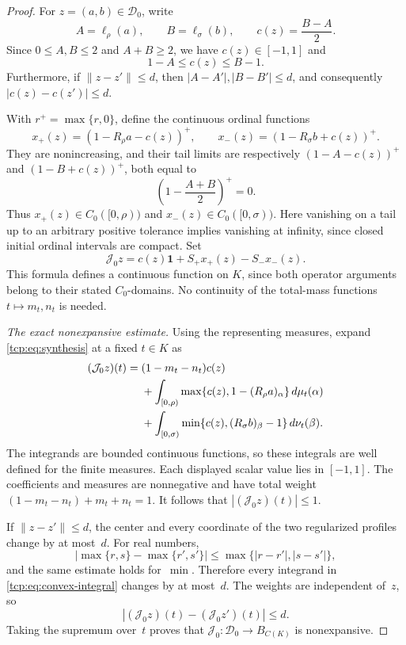 \documentclass[preprint,12pt,nopreprintline]{elsarticle}
\theoremstyle{definition}
\theoremstyle{remark}
\numberwithin{equation}{section}
\begin{document}
\begin{proof}
For $z=(a,b)\in\mathcal D_0$, write
\begin{equation}
 A=\ell_\rho(a),\qquad B=\ell_\sigma(b),\qquad
 c(z)=\frac{B-A}{2}.
 \label{tcp:eq:center}
\end{equation}
Since $0\le A,B\le2$ and $A+B\ge2$, we have $c(z)\in[-1,1]$ and
\begin{equation}
 1-A\le c(z)\le B-1.
 \label{tcp:eq:center-bounds}
\end{equation}
Furthermore, if $\|z-z'\|\le d$, then $|A-A'|,|B-B'|\le d$, and consequently $|c(z)-c(z')|\le d$.

With $r^+=\max\{r,0\}$, define the continuous ordinal functions
\begin{equation}
 x_+(z)=(1-R_\rho a-c(z))^+, \qquad x_-(z)=(1-R_\sigma b+c(z))^+.
 \label{tcp:eq:synthesis-profiles}
\end{equation}
They are nonincreasing, and their tail limits are respectively $(1-A-c(z))^+$ and $(1-B+c(z))^+$, both equal to
\[
 \left(1-\frac{A+B}{2}\right)^+=0.
\]
Thus $x_+(z)\in C_0([0,\rho))$ and $x_-(z)\in C_0([0,\sigma))$. Here vanishing on a tail up to an arbitrary positive tolerance implies vanishing at infinity, since closed initial ordinal intervals are compact. Set
\begin{equation}
\mathcal J_0z=c(z)\mathbf1+S_+x_+(z)-S_-x_-(z).
 \label{tcp:eq:synthesis}
\end{equation}
This formula defines a continuous function on $K$, since both operator arguments belong to their stated $C_0$-domains. No
continuity of the total-mass functions $t\mapsto m_t,n_t$ is needed.

\smallskip\noindent
\emph{The exact nonexpansive estimate.} Using the representing measures, expand \eqref{tcp:eq:synthesis} at a fixed $t\in K$ as
\begin{align}
 (\mathcal J_0z)(t)
 ={}&(1-m_t-n_t)c(z)\notag\\
 &+\int_{[0,\rho)}
       \max\{c(z),1-(R_\rho a)_\alpha\}\,d\mu_t(\alpha)\notag\\
 &+\int_{[0,\sigma)}
       \min\{c(z),(R_\sigma b)_\beta-1\}\,d\nu_t(\beta).
 \label{tcp:eq:convex-integral}
\end{align}
The integrands are bounded continuous functions, so these integrals are well defined for the finite measures. Each displayed scalar value lies in $[-1,1]$. The coefficients and measures are nonnegative and have total weight $(1-m_t-n_t)+m_t+n_t=1$.
It follows that $|(\mathcal J_0z)(t)|\le1$.

If $\|z-z'\|\le d$, the center and every coordinate of the two regularized profiles change by at most~$d$. For real numbers,
\[
 |\max\{r,s\}-\max\{r',s'\}|
 \le\max\{|r-r'|,|s-s'|\},
\]
and the same estimate holds for~$\min$. Therefore every integrand in \eqref{tcp:eq:convex-integral} changes by at most~$d$.
The weights are independent of~$z$, so
\[
 |(\mathcal J_0z)(t)-(\mathcal J_0z')(t)|\le d.
\]
Taking the supremum over~$t$ proves that $\mathcal J_0:\mathcal D_0\to B_{C(K)}$ is nonexpansive.


\end{proof}
\end{document}
